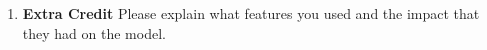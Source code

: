 \documentclass{article}
\begin{document}
\begin{enumerate}
\begin{enumerate}
            \begin{enumerate}[1.]
                \item
            \end{enumerate}

    
        \end{enumerate}
    \item %
    \textbf{Extra Credit} \newline
        Please explain what features you used and the impact that they had on the model. 
    \end{enumerate}
\end{document}
